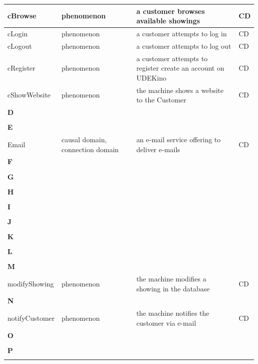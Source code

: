 \documentclass[a4paper,10pt,titlepage,bibtotoc,bibtotocnumbered]{scrreprt}
\begin{document}
\begin{longtable}{|l|l|p{5cm}|l|}
\hline
cBrowse & phenomenon & a customer browses available showings & CD\\
\hline
cLogin & phenomenon & a customer attempts to log in & CD\\
\hline
cLogout & phenomenon & a customer attempts to log out & CD\\
\hline
cRegister & phenomenon & a customer attempts to register create an account on UDEKino & CD\\
\hline
cShowWebsite & phenomenon & the machine shows a website to the Customer & CD\\
\hline
\multicolumn{4}{|l|}{\textbf{D}}\\
\hline
&  &  & \\
\hline
\multicolumn{4}{|l|}{\textbf{E}}\\
\hline
Email & causal domain, connection domain & an e-mail service offering to deliver e-mails & CD\\
\hline
\multicolumn{4}{|l|}{\textbf{F}}\\
\hline
&  &  & \\
\hline
\multicolumn{4}{|l|}{\textbf{G}}\\
\hline
&  &  & \\
\hline
\multicolumn{4}{|l|}{\textbf{H}}\\
\hline
&  &  & \\
\hline
\multicolumn{4}{|l|}{\textbf{I}}\\
\hline
&  &  & \\
\hline
\multicolumn{4}{|l|}{\textbf{J}}\\
\hline
&  &  & \\
\hline
\multicolumn{4}{|l|}{\textbf{K}}\\
\hline
&  &  & \\
\hline
\multicolumn{4}{|l|}{\textbf{L}}\\
\hline
&  &  & \\
\hline
\multicolumn{4}{|l|}{\textbf{M}}\\
\hline
modifyShowing & phenomenon & the machine modifies a showing in the database & CD\\
\hline
\multicolumn{4}{|l|}{\textbf{N}}\\
\hline
notifyCustomer & phenomenon & the machine notifies the customer via e-mail & CD\\
\hline
\multicolumn{4}{|l|}{\textbf{O}}\\
\hline
&  &  & \\
\hline
\multicolumn{4}{|l|}{\textbf{P}}\\
\hline
&  &  & \\

\end{longtable}
\end{document}
